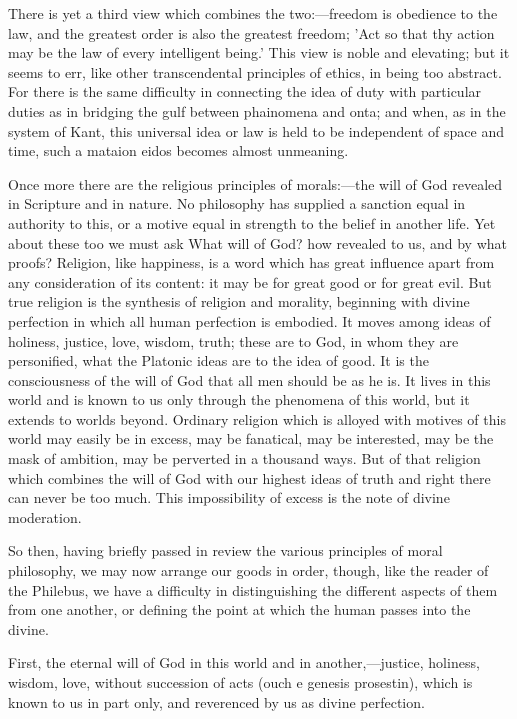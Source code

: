 \documentclass[11pt,letter]{article}
\begin{document}
\par  There is yet a third view which combines the two:—freedom is obedience to the law, and the greatest order is also the greatest freedom; 'Act so that thy action may be the law of every intelligent being.' This view is noble and elevating; but it seems to err, like other transcendental principles of ethics, in being too abstract. For there is the same difficulty in connecting the idea of duty with particular duties as in bridging the gulf between phainomena and onta; and when, as in the system of Kant, this universal idea or law is held to be independent of space and time, such a mataion eidos becomes almost unmeaning.

\par  Once more there are the religious principles of morals:—the will of God revealed in Scripture and in nature. No philosophy has supplied a sanction equal in authority to this, or a motive equal in strength to the belief in another life. Yet about these too we must ask What will of God? how revealed to us, and by what proofs? Religion, like happiness, is a word which has great influence apart from any consideration of its content: it may be for great good or for great evil. But true religion is the synthesis of religion and morality, beginning with divine perfection in which all human perfection is embodied. It moves among ideas of holiness, justice, love, wisdom, truth; these are to God, in whom they are personified, what the Platonic ideas are to the idea of good. It is the consciousness of the will of God that all men should be as he is. It lives in this world and is known to us only through the phenomena of this world, but it extends to worlds beyond. Ordinary religion which is alloyed with motives of this world may easily be in excess, may be fanatical, may be interested, may be the mask of ambition, may be perverted in a thousand ways. But of that religion which combines the will of God with our highest ideas of truth and right there can never be too much. This impossibility of excess is the note of divine moderation.

\par  So then, having briefly passed in review the various principles of moral philosophy, we may now arrange our goods in order, though, like the reader of the Philebus, we have a difficulty in distinguishing the different aspects of them from one another, or defining the point at which the human passes into the divine.

\par  First, the eternal will of God in this world and in another,—justice, holiness, wisdom, love, without succession of acts (ouch e genesis prosestin), which is known to us in part only, and reverenced by us as divine perfection.
\end{document}
